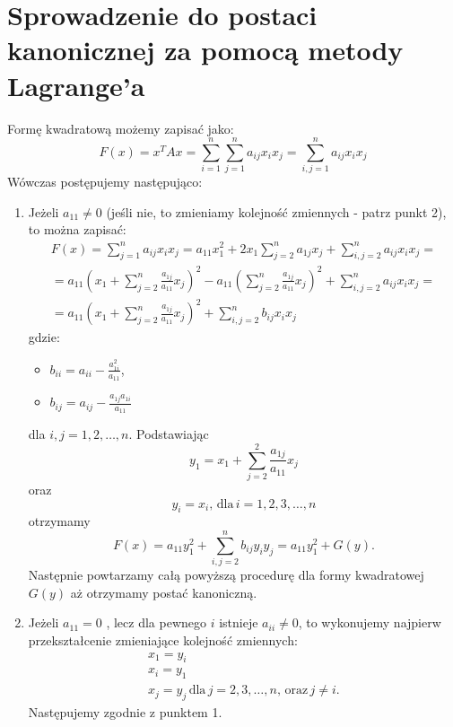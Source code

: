 \documentclass{article}
\begin{document}
\section{Sprowadzenie do postaci kanonicznej za pomocą metody Lagrange'a}
Formę kwadratową możemy zapisać jako:
$$
   F(x) = x^{T}Ax = \sum_{i=1}^{n} \sum_{j=1}^{n}{a_{ij}x_{i}x_{j}} = \sum_{i,j=1}^{n}{a_{ij}x_{i}x_{j}}
$$
Wówczas postępujemy następująco:
\begin{enumerate}
    \item Jeżeli $a_{11} \neq 0$ (jeśli nie, to zmieniamy kolejność zmiennych - patrz punkt 2), to można zapisać:
    $$
        \begin{array}{l}
        F(x) = \sum_{j=1}^{n}{a_{ij}x_{i}x_{j}} = a_{11}x_{1}^{2} + 2x_{1}\sum_{j=2}^{n}{a_{1j}x_{j}} + \sum_{i,j=2}^{n}{a_{ij}x_{i}x_{j}} =\\
        = a_{11} \left( x_{1} + \sum_{j=2}^{n}{\frac{a_{1j}}{a_{11}}x_{j}} \right)^{2} - a_{11} \left( \sum_{j=2}^{n} {\frac{a_{1j}}{a_{11}}x_{j}} \right)^{2} + \sum_{i,j=2}^{n}{a_{ij}x_{i}x_{j}} = \\
        = a_{11} \left( x_{1} + \sum_{j=2}^{n}{\frac{a_{1j}}{a_{11}}x_{j}} \right)^{2} + \sum_{i,j = 2}^{n}{b_{ij}x_{i}x_{j}}
        \end{array}
    $$
    gdzie:
    \begin{itemize}
        \item $b_{ii} = a_{ii} - \frac{a_{1i}^{2}}{a_{11}}$,
        \item $b_{ij} = a_{ij} - \frac{a_{1j}a_{1i}}{a_{11}}$
    \end{itemize}
    dla $i,j = 1, 2, \dots, n$.
    Podstawiając
    $$
        y_{1} = x_{1} + \sum_{j=2}^{2}{\frac{a_{1j}}{a_{11}}x_{j}}
    $$
    oraz
    $$
        y_{i} = x_{i},\, \text{dla}\,i=1,2,3,\dots,n
    $$
    otrzymamy 
    $$
        F(x) = a_{11}y_{1}^{2} + \sum_{i,j = 2}^{n}{b_{ij}y_{i}y_{j}} = a_{11}y_{1}^{2} + G(y).
    $$
    Następnie powtarzamy całą powyższą procedurę dla formy kwadratowej $G(y)$ aż otrzymamy postać kanoniczną.

    \item Jeżeli $a_{11} = 0$ , lecz dla pewnego $i$ istnieje $a_{ii} \neq 0$, to wykonujemy najpierw przekształcenie zmieniające kolejność zmiennych:
    $$
        \begin{array}{l}
             x_{1} = y_{i}\\
             x_{i} = y_{1}\\
             x_{j} = y_{j}\,\text{dla}\, j = 2,3,\dots, n,\,\text{oraz}\, j\neq i.
        \end{array}
    $$
    Następujemy zgodnie z punktem 1.


\end{enumerate}
\end{document}
